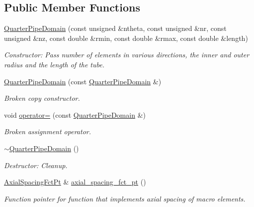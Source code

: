 \subsection*{Public Member Functions}
\begin{DoxyCompactItemize}
\item 
\hyperlink{classoomph_1_1QuarterPipeDomain_afb9763dac929fd4371a6ef860d9a5caf}{Quarter\+Pipe\+Domain} (const unsigned \&ntheta, const unsigned \&nr, const unsigned \&nz, const double \&rmin, const double \&rmax, const double \&length)
\begin{DoxyCompactList}\small\item\em Constructor\+: Pass number of elements in various directions, the inner and outer radius and the length of the tube. \end{DoxyCompactList}\item 
\hyperlink{classoomph_1_1QuarterPipeDomain_a09e3620b090b3bae5d2bf8c2e6ac9812}{Quarter\+Pipe\+Domain} (const \hyperlink{classoomph_1_1QuarterPipeDomain}{Quarter\+Pipe\+Domain} \&)
\begin{DoxyCompactList}\small\item\em Broken copy constructor. \end{DoxyCompactList}\item 
void \hyperlink{classoomph_1_1QuarterPipeDomain_ab6aec719fb0b333abf3ef9a1bf0414ac}{operator=} (const \hyperlink{classoomph_1_1QuarterPipeDomain}{Quarter\+Pipe\+Domain} \&)
\begin{DoxyCompactList}\small\item\em Broken assignment operator. \end{DoxyCompactList}\item 
\hyperlink{classoomph_1_1QuarterPipeDomain_a872560e53bf73ef0bd1b69f2a40612c8}{$\sim$\+Quarter\+Pipe\+Domain} ()
\begin{DoxyCompactList}\small\item\em Destructor\+: Cleanup. \end{DoxyCompactList}\item 
\hyperlink{classoomph_1_1QuarterPipeDomain_a540d441b38146aacb12938d5f885789c}{Axial\+Spacing\+Fct\+Pt} \& \hyperlink{classoomph_1_1QuarterPipeDomain_aa2731d4c5fb22dc0a5d2faa32f99505e}{axial\+\_\+spacing\+\_\+fct\+\_\+pt} ()
\begin{DoxyCompactList}\small\item\em Function pointer for function that implements axial spacing of macro elements. \end{DoxyCompactList}\item 

\end{DoxyCompactItemize}
